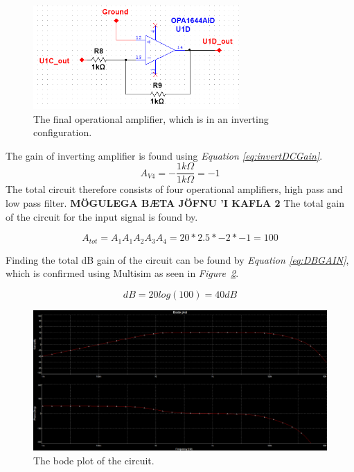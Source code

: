 \begin{figure}[h]
    \centering
    \includegraphics[width=0.70\textwidth]{graphics/OPamp4.png}
    \caption{The final operational amplifier, which is in an inverting configuration.}
    \label{fig:Opamp4}
\end{figure}


The gain of inverting amplifier is found using \textit{Equation \ref{eq:invertDCGain}}.
$$ A_{V4} = -\frac{1k \Omega}{1k \Omega} = -1$$
The total circuit therefore consists of four operational amplifiers, high pass and low pass filter.
\textbf{MÖGULEGA BÆTA JÖFNU 'I KAFLA 2}
The total gain of the circuit for the input signal is found by.

$$A_{tot} = A_1A_1A_2A_3A_4 = 20*2.5*-2*-1 = 100$$

Finding the total dB gain of the circuit can be found by \textit{Equation \ref{eq:DBGAIN}}, which is confirmed using Multisim as seen in \textit{Figure~\ref{fig:bode}}.

$$dB = 20log(100) = 40dB$$


\begin{figure}[h]
    \centering
    \includegraphics[width=1.0\textwidth]{graphics/bodeNew.png}
    \caption{The bode plot of the circuit.}
    \label{fig:bode}
\end{figure}



